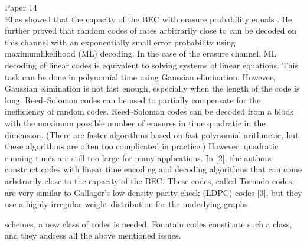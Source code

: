 Paper 14
\\
Elias showed that the capacity of the BEC with erasure probability
equals . He further proved that random codes of
rates arbitrarily close to can be decoded on this channel
with an exponentially small error probability using maximumlikelihood
(ML) decoding. In the case of the erasure channel,
ML decoding of linear codes is equivalent to solving systems
of linear equations. This task can be done in polynomial time
using Gaussian elimination. However, Gaussian elimination is
not fast enough, especially when the length of the code is long.
Reed–Solomon codes can be used to partially compensate
for the inefficiency of random codes. Reed–Solomon codes can
be decoded from a block with the maximum possible number
of erasures in time quadratic in the dimension. (There are
faster algorithms based on fast polynomial arithmetic, but these
algorithms are often too complicated in practice.) However,
quadratic running times are still too large for many applications.
In [2], the authors construct codes with linear time encoding
and decoding algorithms that can come arbitrarily close to the
capacity of the BEC. These codes, called Tornado codes, are
very similar to Gallager’s low-density parity-check (LDPC)
codes [3], but they use a highly irregular weight distribution for
the underlying graphs.

schemes, a new class of codes is needed. Fountain codes
constitute such a class, and they address all the above mentioned
issues.

